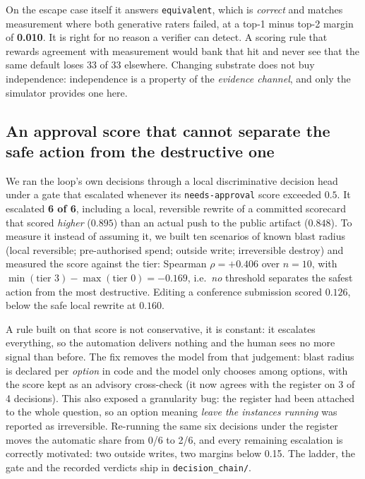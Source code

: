 \documentclass[10pt,twocolumn]{article}
\begin{document}
On the escape case itself it answers \texttt{equivalent}, which is \emph{correct} and
matches measurement where both generative raters failed, at a top-1 minus top-2 margin of
\textbf{0.010}. It is right for no reason a verifier can detect. A scoring rule that
rewards agreement with measurement would bank that hit and never see that the same
default loses 33 of 33 elsewhere. Changing substrate does not buy independence:
independence is a property of the \emph{evidence channel}, and only the simulator
provides one here.

\subsection{An approval score that cannot separate the safe action from the destructive one}
\label{sec:gate2}

We ran the loop's own decisions through a local discriminative decision head under a
gate that escalated whenever its \texttt{needs-approval} score exceeded $0.5$. It
escalated \textbf{6 of 6}, including a local, reversible rewrite of a committed
scorecard that scored \emph{higher} ($0.895$) than an actual push to the public
artifact ($0.848$). To measure it instead of assuming it, we built ten scenarios of known
blast radius (local reversible; pre-authorised spend; outside write; irreversible
destroy) and measured the score against the tier:
Spearman $\rho=+0.406$ over $n=10$, with
$\min(\text{tier }3)-\max(\text{tier }0)=-0.169$, i.e.\ \emph{no} threshold separates
the safest action from the most destructive. Editing a conference submission scored
$0.126$, below the safe local rewrite at $0.160$.

A rule built on that score is not conservative, it is constant: it escalates
everything, so the automation delivers nothing and the human sees no more signal than
before. The fix removes the model from that judgement: blast radius is declared per
\emph{option} in code and the model only chooses among options, with the score kept as
an advisory cross-check (it now agrees with the register on 3 of 4 decisions). This
also exposed a granularity bug: the register had been attached to the whole question,
so an option meaning \emph{leave the instances running} was reported as irreversible.
Re-running the same six decisions under the register moves the automatic share from
0/6 to 2/6, and every remaining escalation is correctly motivated: two outside writes,
two margins below 0.15. The ladder, the gate and the recorded verdicts ship in
\texttt{decision\_chain/}.
\end{document}
